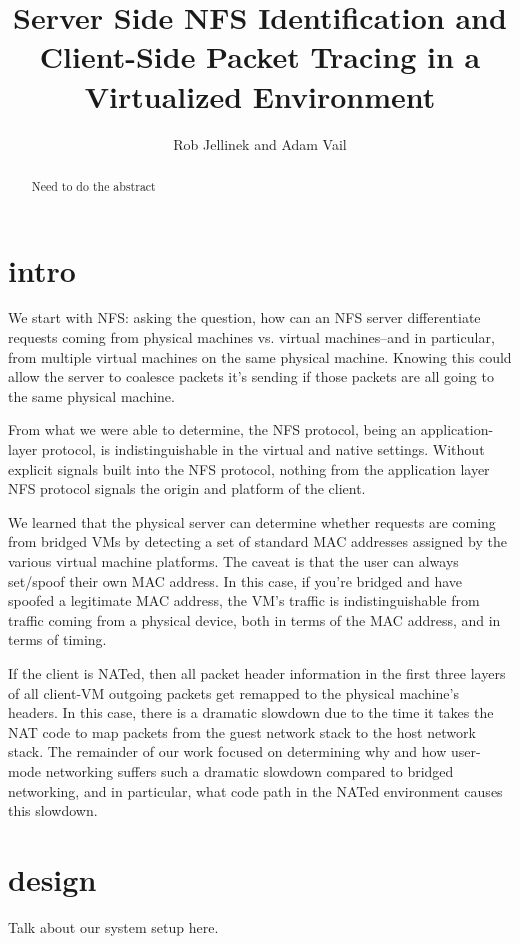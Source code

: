 \documentclass[11pt,pdftex,twocolumn]{article}
\title{Server Side NFS Identification and Client-Side Packet Tracing in a Virtualized Environment}
\author{Rob Jellinek and Adam Vail}
\begin{document}
\maketitle

\begin{abstract}
Need to do the abstract
\end{abstract}
\section{intro}
We start with NFS: asking the question, how can an NFS server differentiate requests coming from physical machines vs. virtual machines--and in particular, from multiple virtual machines on the same physical machine. Knowing this could allow the server to coalesce packets it's sending if those packets are all going to the same physical machine. 

From what we were able to determine, the NFS protocol, being an application-layer protocol, is indistinguishable in the virtual and native settings. Without explicit signals built into the NFS protocol, nothing from the application layer NFS protocol signals the origin and platform of the client. 

We learned that the physical server can determine whether requests are coming from bridged VMs by detecting a set of standard MAC addresses assigned by the various virtual machine platforms. The caveat is that the user can always set/spoof their own MAC address. In this case, if you're bridged and have spoofed a legitimate MAC address, the VM's traffic is indistinguishable from traffic coming from a physical device, both in terms of the MAC address, and in terms of timing.

If the client is NATed, then all packet header information in the first three layers of all client-VM outgoing packets get remapped to the physical machine's headers. In this case, there is a dramatic slowdown due to the time it takes the NAT code to map packets from the guest network stack to the host network stack. The remainder of our work focused on determining why and how user-mode networking suffers such a dramatic slowdown compared to bridged networking, and in particular, what code path in the NATed environment causes this slowdown.


%

\section{design}
Talk about our system setup here. 
\end{document}
